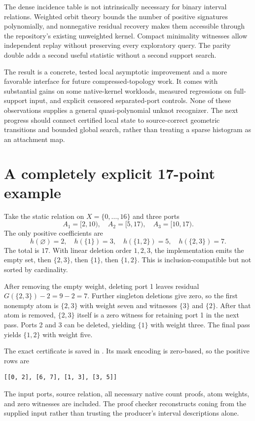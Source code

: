 \documentclass[11pt,letterpaper]{article}
\theoremstyle{definition}\newtheorem{definition}[theorem]{Definition}
\theoremstyle{remark}\newtheorem{remark}[theorem]{Remark}
\begin{document}
The dense incidence table is not intrinsically necessary for binary interval relations. Weighted orbit theory bounds the number of positive signatures polynomially, and nonnegative residual recovery makes them accessible through the repository's existing unweighted kernel. Compact minimality witnesses allow independent replay without preserving every exploratory query. The parity double adds a second useful statistic without a second support search.

The result is a concrete, tested local asymptotic improvement and a more favorable interface for future compressed-topology work. It comes with substantial gains on some native-kernel workloads, measured regressions on full-support input, and explicit censored separated-port controls. None of these observations supplies a general quasi-polynomial unknot recognizer. The next progress should connect certified local state to source-correct geometric transitions and bounded global search, rather than treating a sparse histogram as an attachment map.

\appendix
\section{A completely explicit 17-point example}
\label{app:example}

Take the static relation on $X=\{0,\ldots,16\}$ and three ports
\[
A_1=[2,10),\quad A_2=[5,17),\quad A_3=[10,17).
\]
The only positive coefficients are
\[
h(\varnothing)=2,\quad h(\{1\})=3,\quad
h(\{1,2\})=5,\quad h(\{2,3\})=7.
\]
The total is $17$. With linear deletion order $1,2,3$, the implementation emits the empty set, then $\{2,3\}$, then $\{1\}$, then $\{1,2\}$. This is inclusion-compatible but not sorted by cardinality.

After removing the empty weight, deleting port 1 leaves residual
$G(\{2,3\})-2=9-2=7$. Further singleton deletions give zero, so the first nonempty atom is $\{2,3\}$ with weight seven and witnesses $\{3\}$ and $\{2\}$. After that atom is removed, $\{2,3\}$ itself is a zero witness for retaining port 1 in the next pass. Ports 2 and 3 can be deleted, yielding $\{1\}$ with weight three. The final pass yields $\{1,2\}$ with weight five.

The exact certificate is saved in . Its mask encoding is zero-based, so the positive rows are
\begin{lstlisting}
[[0, 2], [6, 7], [1, 3], [3, 5]]
\end{lstlisting}
The input ports, source relation, all necessary native count proofs, atom weights, and zero witnesses are included. The proof checker reconstructs coning from the supplied input rather than trusting the producer's interval descriptions alone.
\end{document}
